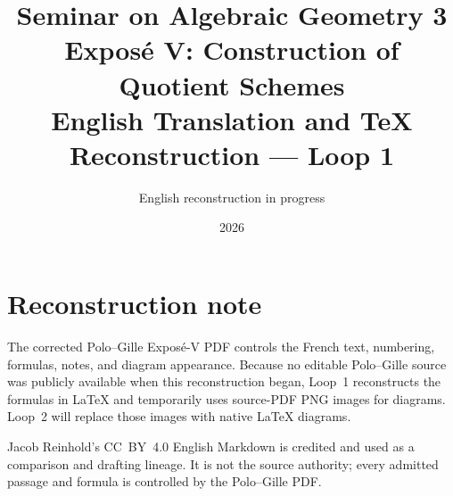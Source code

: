 \documentclass[11pt,a4paper,oneside]{book}
\title{Seminar on Algebraic Geometry 3\\
  \large Expos\'e V: Construction of Quotient Schemes\\[0.75em]
  \normalsize English Translation and TeX Reconstruction --- Loop 1}
\author{English reconstruction in progress}
\date{2026}
\begin{document}
\frontmatter
\maketitle

\chapter*{Reconstruction note}
The corrected Polo--Gille Expos\'e-V PDF controls the French text,
numbering, formulas, notes, and diagram appearance. Because no editable
Polo--Gille source was publicly available when this reconstruction
began, Loop~1 reconstructs the formulas in \LaTeX{} and temporarily
uses source-PDF PNG images for diagrams. Loop~2 will replace those
images with native \LaTeX{} diagrams.

Jacob Reinhold's CC~BY~4.0 English Markdown is credited and used as a
comparison and drafting lineage. It is not the source authority; every
admitted passage and formula is controlled by the Polo--Gille PDF.

\tableofcontents
\mainmatter
\setcounter{footnote}{0}


\end{document}
